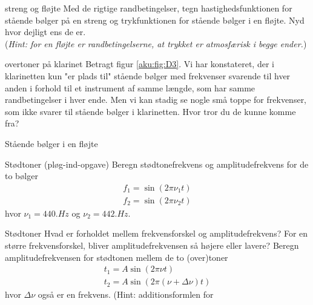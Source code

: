 \documentclass[crop=false, class=memoir]{standalone}
\begin{document}
\begin{opgave}[2]{streng og fløjte}
Med de rigtige randbetingelser, tegn hastighedsfunktionen for stående bølger på en streng og trykfunktionen for stående bølger i en fløjte. Nyd hvor dejligt ens de er.\\
(\textit{Hint: for en fløjte er randbetingelserne, at trykket er atmosfærisk i begge ender.})
\end{opgave}
\begin{opgave}[3]{overtoner på klarinet}
Betragt figur \ref{aku:fig:D3}. Vi har konstateret, der i klarinetten kun "er plads til" stående bølger med frekvenser svarende til hver anden i forhold til et instrument af samme længde, som har samme randbetingelser i hver ende. Men vi kan stadig se nogle små toppe for frekvenser, som ikke svarer til stående bølger i klarinetten. Hvor tror du de kunne komme fra?
\end{opgave}
\begin{opgave}{Stående bølger i en fløjte}
\end{opgave}
\begin{opgave}[1]{Stødtoner (pløg-ind-opgave)}
    Beregn stødtonefrekvens og amplitudefrekvens for de to bølger
    \begin{gather*}
        f_1=\sin(2\pi \nu_1 t)\\
        f_2=\sin(2\pi \nu_2 t)
    \end{gather*}
    hvor $\nu_1=440 \si{.Hz}$ og $\nu_2=442 \si{.Hz}$.
\end{opgave}
\begin{opgave}[2]{Stødtoner}
    Hvad er forholdet mellem frekvensforskel og amplitudefrekvens?
        \opg For en større frekvensforskel, bliver amplitudefrekvensen så højere eller lavere?
        \opg Beregn amplitudefrekvensen for stødtonen mellem de to (over)toner
        \begin{gather*}
            t_1=A\sin(2\pi \nu t)\\
            t_2=A\sin(2\pi (\nu+\Delta \nu) t)
        \end{gather*}
        hvor $\Delta \nu $ også er en frekvens.
    (Hint: additionsformlen for %
\end{opgave}
\end{document}
